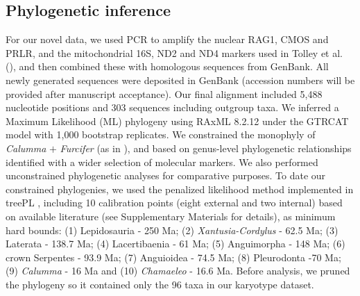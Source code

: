 \documentclass[a4paper, 12pt]{article}
\begin{document}
\subsection{Phylogenetic inference}
For our novel data, we used PCR to amplify the nuclear RAG1, CMOS and PRLR, and the mitochondrial 16S, ND2 and ND4 markers used in Tolley et al. (\citeyear{tolley2013large}), and then combined these with homologous sequences from GenBank. 
All newly generated sequences were deposited in GenBank (accession numbers will be provided after manuscript acceptance). 
Our final alignment included 5,488 nucleotide positions and 303 sequences including outgroup taxa. 
We inferred a Maximum Likelihood (ML) phylogeny using RAxML 8.2.12 \citep{stamatakis2014raxml} under the GTRCAT model with 1,000 bootstrap replicates. 
We constrained the monophyly of \textit{Calumma} $+$ \textit{Furcifer} (as in \citealt{tolley2013large}), and based on genus-level phylogenetic relationships identified with a wider selection of molecular markers. 
We also performed unconstrained phylogenetic analyses for comparative purposes. 
To date our constrained phylogenies, we used the penalized likelihood method implemented in treePL \citep{smith2012treepl}, including 10 calibration points (eight external and two internal) based on available literature (see Supplementary Materials for details), as minimum hard bounds: (1) Lepidosauria - 250 Ma; (2) \textit{Xantusia-Cordylus} - 62.5 Ma; (3) Laterata - 138.7 Ma; (4) Lacertibaenia - 61 Ma; (5) Anguimorpha - 148 Ma; (6) crown Serpentes - 93.9 Ma; (7) Anguioidea - 74.5 Ma; (8) Pleurodonta -70 Ma; (9) \textit{Calumma} - 16 Ma and (10) \textit{Chamaeleo} - 16.6 Ma. 
Before analysis, we pruned the phylogeny so it contained only the 96 taxa in our karyotype dataset.
\end{document}

